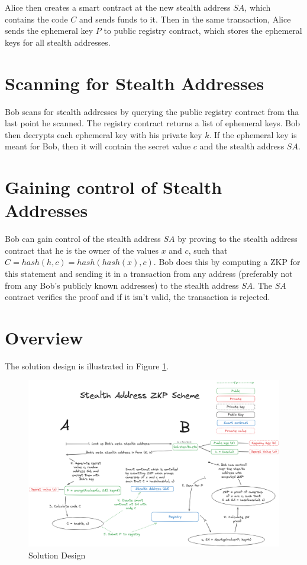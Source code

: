 Alice then creates a smart contract at the new stealth address $SA$, which contains
the code $C$ and sends funds to it. Then in the same transaction, Alice sends
the ephemeral key $P$ to public registry contract, which stores the ephemeral
keys for all stealth addresses.

\section{Scanning for Stealth Addresses}

Bob scans for stealth addresses by querying the public registry contract
from tha last point he scanned. The registry contract returns a list of
ephemeral keys. Bob then decrypts each ephemeral key with his private key $k$.
If the ephemeral key is meant for Bob, then it will contain the secret value
$c$ and the stealth address $SA$.

\section{Gaining control of Stealth Addresses}

Bob can gain control of the stealth address $SA$ by proving to the stealth
address contract that he is the owner of the values $x$ and $c$, such that
$C = hash(h, c) = hash(hash(x), c)$. Bob does this by computing a ZKP for 
this statement and sending it in a transaction from any address (preferably
not from any Bob's publicly known addresses) to the stealth address $SA$. The
$SA$ contract verifies the proof and if it isn't valid, the transaction is
rejected.

\section{Overview}

The solution design is illustrated in Figure \ref{fig:solution}.

\begin{figure}[h]
    \centering
    \includegraphics[scale=0.15]{assets/images/solution.png}
    \caption{Solution Design}
    \label{fig:solution}
    \vspace{0.5cm}
\end{figure}


